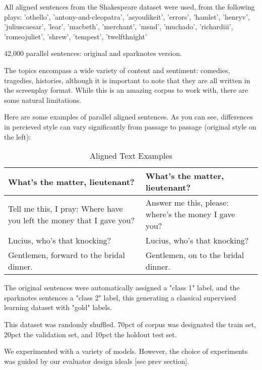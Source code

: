\documentclass[letterpaper, 10 pt, conference]{ieeeconf}  %
\begin{document}
All aligned sentences from the Shakespeare dataset were used, from the following plays: 'othello', 'antony-and-cleopatra', 'asyoulikeit', 
                     'errors', 'hamlet', 'henryv', 'juliuscaesar', 'lear', 'macbeth', 
                     'merchant', 'msnd', 'muchado', 'richardiii', 'romeojuliet', 
                     'shrew', 'tempest', 'twelfthnight'

42,000 parallel sentences: original and sparknotes version.

The topics encompass a wide variety of content and sentiment: comedies, tragedies, histories, although it is important to note that they are all written in the screenplay format. While this is an amazing corpus to work with, there are some natural limitations.

Here are some examples of parallel aligned sentences. As you can see, differences in percieved style can vary significantly from passage to passage (original style on the left):


\begin{table}[h]
  \caption{Aligned Text Examples}
  \label{table_example}
  \begin{center}
    \begin{tabular}{| p{3.5cm}  | p{3.5cm} |}
    \hline
    What's the matter, lieutenant? & What's the matter, lieutenant?\\
    \hline
    Tell me this, I pray: Where have you left the money that I gave you? & Answer me this, please: where's the money I gave you?\\
    \hline
    Lucius, who's that knocking? & Lucius, who's that knocking?\\
    \hline
    Gentlemen, forward to the bridal dinner. & Gentlemen, on to the bridal dinner.\\
    \hline
    \end{tabular}
  \end{center}
\end{table}




The original sentences were automatically assigned a "class 1" label, and the sparknotes sentences a "class 2" label, this generating a classical supervised learning dataset with "gold" labels.

This dataset was randomly shuffled. 70pct of corpus was designated the train set, 20pct the validation set, and 10pct the holdout test set.
 
We experimented with a variety of models. However, the choice of experiments was guided by our evaluator design ideals [see prev section].
\end{document}
